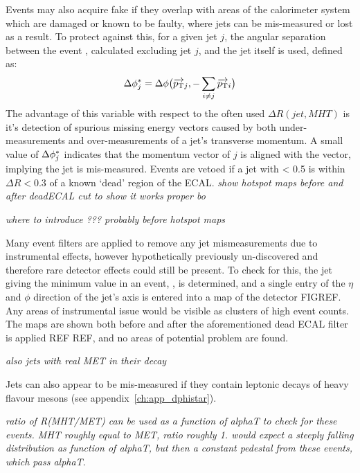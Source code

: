 Events may also acquire fake \mht if they overlap with areas of the calorimeter 
system which are damaged or known to be faulty, where jets can be mis-measured or 
lost as a result. To protect against this, for a given jet $j$, the angular separation
between the event \mht, calculated excluding jet $j$, and the jet itself is used, defined
as:
% 
\begin{equation}
\Delta \phi^*_j = \Delta \phi\big(\overrightarrow{{p_{\text T}}}_j,-\sum_{i\neq j}{\overrightarrow{{p_{\text T}}}_i}\big)
\label{eq:biasdphi}
\end{equation}
% 
The advantage of this variable with respect to the often used
$\Delta R(jet, MHT)$ is it's detection of spurious missing energy vectors caused
by both under-measurements and over-measurements of a jet's transverse momentum.
A small value of $\Delta \phi^*_j$ indicates that the momentum vector of $j$
is aligned with the \mht vector, implying the jet is mis-measured. Events are 
vetoed if a jet with \dphistar< 0.5 is within $\Delta R < 0.3$ of a known
`dead' region of the ECAL.
\emph{show hotspot maps before and after deadECAL cut to show it works proper
bo}

\emph{where to introduce \mindphistar??? probably before hotspot maps}

Many event filters are applied to remove any jet mismeasurements due
to instrumental effects, however hypothetically previously un-discovered and
therefore rare detector effects could still be present. To check for this, the
jet giving the minimum \dphistar value in an event, \mindphistar, is determined,
and a single entry of the $\eta$ and $\phi$ direction of the jet's axis is entered
into a map of the detector FIGREF. Any areas of instrumental issue would be
visible as clusters of high event counts. The maps are shown both before and
after the aforementioned dead ECAL filter is applied REF REF, and no areas of
potential problem are found.

\emph{also jets with real MET in their decay}

Jets can also appear to be mis-measured if they contain leptonic decays of heavy
flavour mesons (see appendix~\ref{ch:app_dphistar}). 

\emph{ratio of R(MHT/MET) can be used as a function of alphaT to check for
these events. MHT roughly equal to MET, ratio roughly 1. would expect a steeply
falling distribution as function of alphaT, but then a constant pedestal from
these events, which pass alphaT}.

